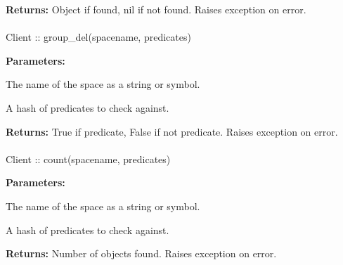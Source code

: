 \noindent\textbf{Returns:}
Object if found, nil if not found.  Raises exception on error.

\paragraph{}
\label{api:ruby:group_del}
\begin{ccode}
Client :: group_del(spacename, predicates)
\end{ccode}
\funcdesc 

\noindent\textbf{Parameters:}
\begin{description}[labelindent=\widthof{{\code{predicates}}},leftmargin=*,noitemsep,nolistsep,align=right]
\item[\code{spacename}] The name of the space as a string or symbol.
\item[\code{predicates}] A hash of predicates to check against.
\end{description}

\noindent\textbf{Returns:}
True if predicate, False if not predicate.  Raises exception on error.

\paragraph{}
\label{api:ruby:count}
\begin{ccode}
Client :: count(spacename, predicates)
\end{ccode}
\funcdesc 

\noindent\textbf{Parameters:}
\begin{description}[labelindent=\widthof{{\code{predicates}}},leftmargin=*,noitemsep,nolistsep,align=right]
\item[\code{spacename}] The name of the space as a string or symbol.
\item[\code{predicates}] A hash of predicates to check against.
\end{description}

\noindent\textbf{Returns:}
Number of objects found.  Raises exception on error.
